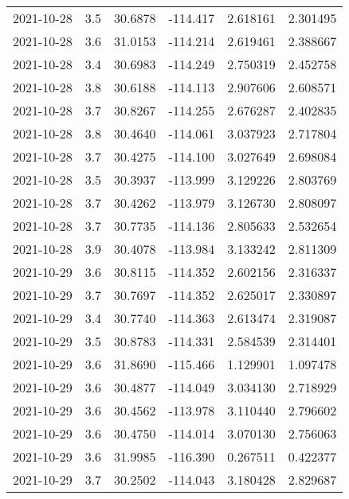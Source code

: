 \begin{tabular}{lrrrrr}
2021-10-28 &       3.5 &  30.6878 &  -114.417 &         2.618161 &         2.301495 \\
2021-10-28 &       3.6 &  31.0153 &  -114.214 &         2.619461 &         2.388667 \\
2021-10-28 &       3.4 &  30.6983 &  -114.249 &         2.750319 &         2.452758 \\
2021-10-28 &       3.8 &  30.6188 &  -114.113 &         2.907606 &         2.608571 \\
2021-10-28 &       3.7 &  30.8267 &  -114.255 &         2.676287 &         2.402835 \\
2021-10-28 &       3.8 &  30.4640 &  -114.061 &         3.037923 &         2.717804 \\
2021-10-28 &       3.7 &  30.4275 &  -114.100 &         3.027649 &         2.698084 \\
2021-10-28 &       3.5 &  30.3937 &  -113.999 &         3.129226 &         2.803769 \\
2021-10-28 &       3.7 &  30.4262 &  -113.979 &         3.126730 &         2.808097 \\
2021-10-28 &       3.7 &  30.7735 &  -114.136 &         2.805633 &         2.532654 \\
2021-10-28 &       3.9 &  30.4078 &  -113.984 &         3.133242 &         2.811309 \\
2021-10-29 &       3.6 &  30.8115 &  -114.352 &         2.602156 &         2.316337 \\
2021-10-29 &       3.7 &  30.7697 &  -114.352 &         2.625017 &         2.330897 \\
2021-10-29 &       3.4 &  30.7740 &  -114.363 &         2.613474 &         2.319087 \\
2021-10-29 &       3.5 &  30.8783 &  -114.331 &         2.584539 &         2.314401 \\
2021-10-29 &       3.6 &  31.8690 &  -115.466 &         1.129901 &         1.097478 \\
2021-10-29 &       3.6 &  30.4877 &  -114.049 &         3.034130 &         2.718929 \\
2021-10-29 &       3.6 &  30.4562 &  -113.978 &         3.110440 &         2.796602 \\
2021-10-29 &       3.6 &  30.4750 &  -114.014 &         3.070130 &         2.756063 \\
2021-10-29 &       3.6 &  31.9985 &  -116.390 &         0.267511 &         0.422377 \\
2021-10-29 &       3.7 &  30.2502 &  -114.043 &         3.180428 &         2.829687 \\

\end{tabular}
